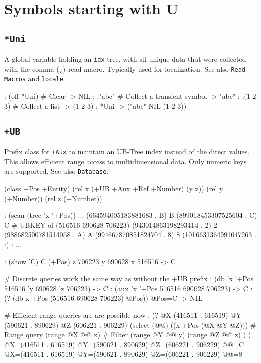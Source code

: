 %
%
%


\chapter{Symbols starting with U}
\label{cha:func-ref-U-functions-starting-with-U}

\section*{\texttt{*Uni}}
\label{sec:func-ref-U-*Uni}


A global variable holding an \texttt{idx} tree, with all unique data that were
collected with the comma (\texttt{,}) read-macro. Typically used for
localization. See also \texttt{Read-Macros} and \texttt{locale}.


\begin{wideverbatim}
: (off *Uni)            # Clear
-> NIL
: ,"abc"                # Collect a transient symbol
-> "abc"
: ,(1 2 3)              # Collect a list
-> (1 2 3)
: *Uni
-> ("abc" NIL (1 2 3))
\end{wideverbatim}

 
\section*{\texttt{+UB}}
\label{sec:func-ref-U-+UB}


Prefix class for \texttt{+Aux} to maintain an UB-Tree index instead of the
direct values. This allows efficient range access to multidimensional
data. Only numeric keys are supported. See also \texttt{Database}.


\begin{wideverbatim}
(class +Pos +Entity)
(rel x (+UB +Aux +Ref +Number) (y z))
(rel y (+Number))
(rel z (+Number))

: (scan (tree 'x '+Pos))
...
(664594005183881683 . {B}) {B}
(899018453307525604 . {C}) {C}  # UBKEY of (516516 690628 706223)
(943014863198293414 . {2}) {2}
(988682500781514058 . {A}) {A}
(994667870851824704 . {8}) {8}
(1016631364991047263 . {:}) {:}
...

: (show '{C})
{C} (+Pos)
   z 706223
   y 690628
   x 516516
-> {C}

# Discrete queries work the same way as without the +UB prefix
: (db 'x '+Pos 516516 'y 690628 'z 706223)
-> {C}
: (aux 'x '+Pos 516516 690628 706223)
-> {C}
: (? (db x +Pos (516516 690628 706223) @Pos))
 @Pos={C}
-> NIL

# Efficient range queries are are possible now
: (?
   @X (416511 . 616519)
   @Y (590621 . 890629)
   @Z (606221 . 906229)
   (select (@@)
      ((x +Pos (@X @Y @Z)))   # Range query
      (range @X @@ x)         # Filter
      (range @Y @@ y)
      (range @Z @@ z) ) )
 @X=(416511 . 616519) @Y=(590621 . 890629) @Z=(606221 . 906229) @@={C}
 @X=(416511 . 616519) @Y=(590621 . 890629) @Z=(606221 . 906229) @@={8}
\end{wideverbatim}

